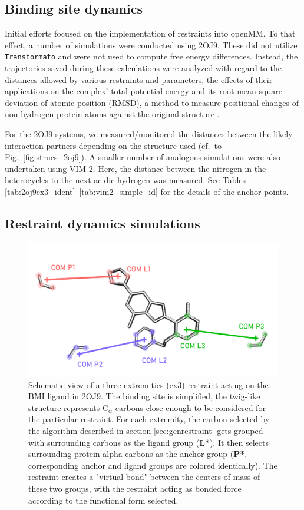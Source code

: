 \documentclass[oneside]{scrreprt}
\begin{document}
\subsection{Binding site dynamics}

Initial efforts  focused on the implementation of restraints into  openMM. To that effect, a number of simulations were conducted using 2OJ9. These did not utilize \texttt{Transformato} and were not used to compute free energy differences. Instead, the trajectories saved during these calculations were analyzed with regard to the distances allowed by various restraints and parameters, the effects of their applications on the complex' total potential energy and its root mean square deviation of atomic position (RMSD), a method to measure positional changes of non-hydrogen protein atoms against the original structure \cite{yusuf_alternative_2008}.

For the 2OJ9 systems, we measured/monitored the distances between the likely interaction partners depending on the structure used (cf.\ to Fig.~\ref{fig:strucs_2oj9}). A smaller number of analogous simulations were also undertaken using VIM-2. Here, the distance between the nitrogen in the heterocycles to the next acidic hydrogen was measured. See Tables \ref{tab:2oj9ex3_ident}--\ref{tab:vim2_simple_id} for the details of the anchor points.
\subsection{Restraint dynamics simulations}
\begin{figure}[h]
    \centering
    \includegraphics[width=1\textwidth]{figs/explanation_ex3.png}
    \caption[Explanation of ex3 - restraint dynamics measurement] {Schematic view of a three-extremities (ex3) restraint acting on the BMI ligand in 2OJ9. The binding site is simplified, the twig-like structure represents C$_\alpha$ carbons close enough to be considered for the particular restraint. For each extremity, the carbon selected by the algorithm described in section \ref{sec:genrestraint} gets grouped with surrounding carbons as the ligand group (\textbf{L*}). It then selects surrounding protein alpha-carbons as the anchor group (\textbf{P*}, corresponding anchor and ligand groups are colored identically). The restraint creates a "virtual bond" between the centers of mass of these two groups, with the restraint acting as bonded force according to the functional form selected.}
    \label{fig:explanation_ex3}
\end{figure}
\end{document}
